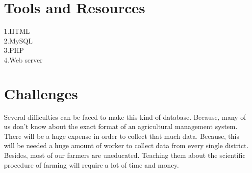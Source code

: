 \documentclass{article}
\begin{document}
\section{Tools and Resources}
1.HTML \\
2.MySQL \\
3.PHP \\
4.Web server \\

\section{Challenges}
Several difficulties can be faced to make this kind of database. Because, many of us don't know about the exact format of an agricultural management system. There will be a huge expense in order to collect that much data. Because, this will be needed a huge amount of worker to collect data from every single district. Besides, most of our farmers are uneducated. Teaching them about the scientific procedure of farming will require a lot of time and money.
\end{document}

